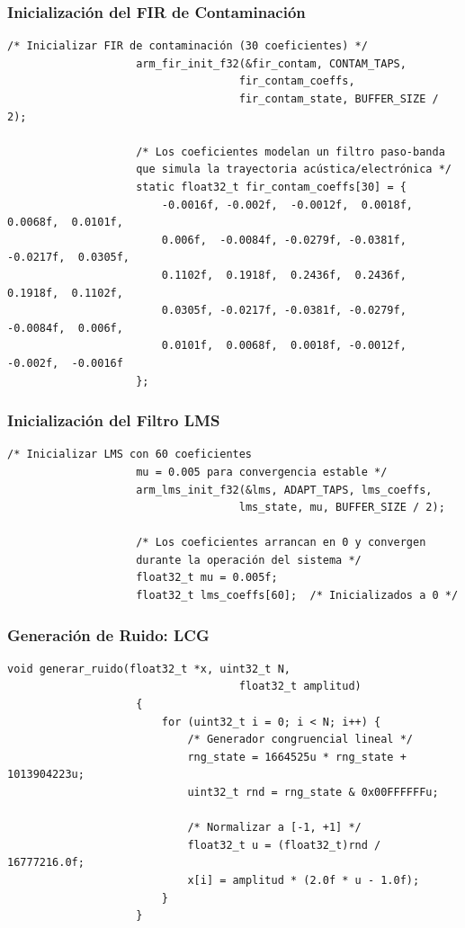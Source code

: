 \documentclass[12pt]{article}
\begin{document}
			\subsubsection{Inicialización del FIR de Contaminación}

				\begin{lstlisting}[style=mystyle]
					/* Inicializar FIR de contaminación (30 coeficientes) */
					arm_fir_init_f32(&fir_contam, CONTAM_TAPS, 
									fir_contam_coeffs,
									fir_contam_state, BUFFER_SIZE / 2);

					/* Los coeficientes modelan un filtro paso-banda
					que simula la trayectoria acústica/electrónica */
					static float32_t fir_contam_coeffs[30] = {
						-0.0016f, -0.002f,  -0.0012f,  0.0018f,  0.0068f,  0.0101f,
						0.006f,  -0.0084f, -0.0279f, -0.0381f, -0.0217f,  0.0305f,
						0.1102f,  0.1918f,  0.2436f,  0.2436f,  0.1918f,  0.1102f,
						0.0305f, -0.0217f, -0.0381f, -0.0279f, -0.0084f,  0.006f,
						0.0101f,  0.0068f,  0.0018f, -0.0012f, -0.002f,  -0.0016f
					};
				\end{lstlisting}

			\subsubsection{Inicialización del Filtro LMS}

				\begin{lstlisting}[style=mystyle]
					/* Inicializar LMS con 60 coeficientes
					mu = 0.005 para convergencia estable */
					arm_lms_init_f32(&lms, ADAPT_TAPS, lms_coeffs, 
									lms_state, mu, BUFFER_SIZE / 2);

					/* Los coeficientes arrancan en 0 y convergen
					durante la operación del sistema */
					float32_t mu = 0.005f;
					float32_t lms_coeffs[60];  /* Inicializados a 0 */
				\end{lstlisting}

			\subsubsection{Generación de Ruido: LCG}

				\begin{lstlisting}[style=mystyle]
					void generar_ruido(float32_t *x, uint32_t N, 
									float32_t amplitud)
					{
						for (uint32_t i = 0; i < N; i++) {
							/* Generador congruencial lineal */
							rng_state = 1664525u * rng_state + 1013904223u;
							uint32_t rnd = rng_state & 0x00FFFFFFu;
							
							/* Normalizar a [-1, +1] */
							float32_t u = (float32_t)rnd / 16777216.0f;
							x[i] = amplitud * (2.0f * u - 1.0f);
						}
					}
				\end{lstlisting}
\end{document}
